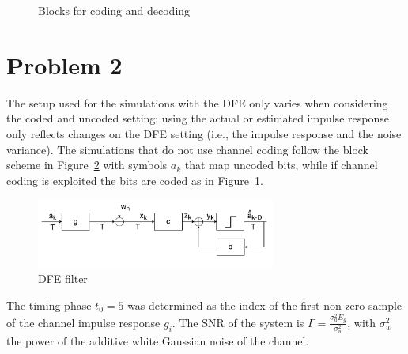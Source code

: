 \documentclass[10pt]{article}
\begin{document}
\begin{figure}[H]
	\centering
	\caption{Blocks for coding and decoding}
	\label{fig:code}
\end{figure}

\FloatBarrier


\section*{Problem 2}
The setup used for the simulations with the DFE only varies when considering the coded and uncoded setting: using the actual or estimated impulse response only reflects changes on the DFE setting (i.e., the impulse response and the noise variance). 
The simulations that do not use channel coding follow the block scheme in Figure~\ref{fig:DFE_system} with symbols $a_k$ that map uncoded bits, while if channel coding is exploited the bits are coded as in Figure~\ref{fig:code}.

\begin{figure}[h!]
	\centering
	\includegraphics[width = 0.7\textwidth]{DFE}
	\caption{DFE filter}
	\label{fig:DFE_system}
\end{figure}

The timing phase $t_0 = 5$ was determined as the index of the first non-zero sample of the channel impulse response ${g_i}$. The SNR of the system is $\Gamma = \frac{\sigma_a^2 E_g}{\sigma_w^2}$, with $\sigma_w^2$ the power of the additive white Gaussian noise of the channel.
\end{document}
